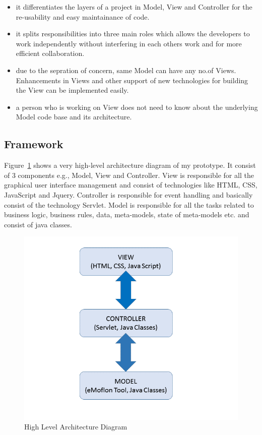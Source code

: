\begin{itemize}
	\item {it differentiates the layers of a project in Model, View and Controller for the re-usability and easy maintainance of code.}
	\item {it splits responsibilities into three main roles which allows the developers to work independently without interfering in each others work and for more efficient collaboration.}
	\item {due to the sepration of concern, same Model can have any no.of Views. Enhancements in Views and other support of new technologies for building the View can be implemented easily.}
	\item {a person who is working on View does not need to know about the underlying Model code base and its architecture.}
\end{itemize}

\subsection{Framework}\label{subsec:framework}
Figure~\ref{fig:Architecture_Diagram} shows a very high-level architecture diagram of my prototype. It consist of 3 components e.g., Model, View and Controller. View is responsible for all the graphical user interface management and consist of technologies like HTML, CSS, JavaScript and Jquery. Controller is responsible for event handling and basically consist of the technology Servlet. Model is responsible for all the tasks related to business logic, business rules, data, meta-models, state of meta-models etc. and consist of java classes.

\begin{figure}
	\includegraphics[width=1\textwidth]{figures/Highlevel_Arch}
	\caption{High Level Architecture Diagram}
	\label{fig:Architecture_Diagram}
\end{figure}

